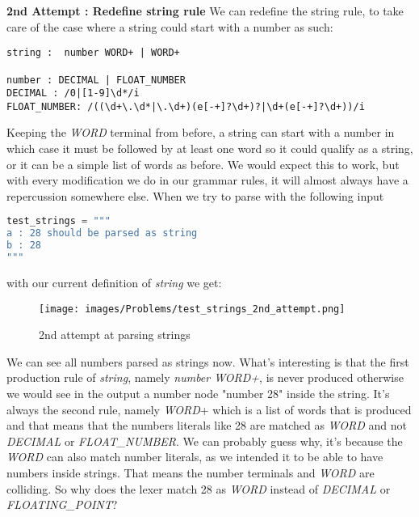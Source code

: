 \documentclass[12pt]{article}
\begin{document}
\textbf{2nd  Attempt : Redefine string rule
}
We can redefine the string rule, to take care of the case where a string could start with a number as such:
\begin{lstlisting}
string :  number WORD+ | WORD+
 
number : DECIMAL | FLOAT_NUMBER
DECIMAL : /0|[1-9]\d*/i
FLOAT_NUMBER: /((\d+\.\d*|\.\d+)(e[-+]?\d+)?|\d+(e[-+]?\d+))/i
\end{lstlisting}
Keeping the \emph{WORD} terminal from before, a string can start with a number in which case it must be followed by at least one word so it could qualify as a string, or it can be a simple list of words as before. We would expect this to work, but with every modification we do in our grammar rules, it will almost always have a repercussion somewhere else. When we try to parse with the following input 

\begin{lstlisting}[language=python]
test_strings = """
a : 28 should be parsed as string
b : 28
"""
\end{lstlisting}

with our current definition of \emph{string} we get:

\begin{figure}[h!]
 	\centering
 	\caption{2nd attempt at parsing strings}
 	\texttt{[image: images/Problems/test\_strings\_2nd\_attempt.png]}
 	\label{lab:perceptron}
\end{figure}
We can see all numbers parsed as strings now. What’s interesting is that the first production rule of \emph{string}, namely \emph{number WORD+}, is never produced otherwise we would see in the output a number node "number 28" inside the string. It’s always the second rule, namely \emph{WORD}+ which is a list of words that is produced and that means that the numbers literals like 28 are matched as \emph{WORD} and not \emph{DECIMAL} or \emph{FLOAT\_NUMBER}. We can probably guess why, it’s because the \emph{WORD} can also match number literals, as we intended it to be able to have numbers inside strings. That means the number terminals and \emph{WORD} are colliding. So why does the lexer match 28 as \emph{WORD} instead of \emph{DECIMAL} or \emph{FLOATING\_POINT}?
\end{document}
